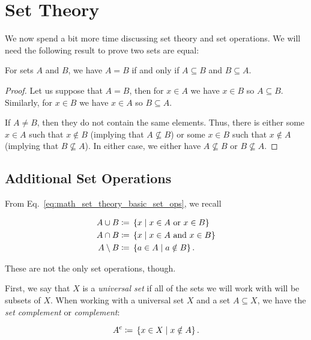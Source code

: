 \section{Set Theory}
\label{app:math_set_theory}

We now spend a bit more time discussing set theory and set operations.
We will need the following result to prove two \glspl{set} are equal:

\begin{thm}
\label{thm:set_equality}
For \glspl{set} $A$ and $B$, we have $A=B$ if and only if
$A\subseteq B$ and $B\subseteq A$.
\end{thm}

\begin{proof}
Let us suppose that $A=B$, then for $x\in A$ we have $x\in B$
so $A\subseteq B$.
Similarly, for $x\in B$ we have $x\in A$ so $B\subseteq A$.

If $A\ne B$, then they do not contain the same elements.
Thus, there is either some $x\in A$ such that $x \notin B$
(implying that $A\not\subseteq B$)
or some $x\in B$ such that $x\notin A$
(implying that $B\not\subseteq A$).
In either case, we either have $A\not\subseteq B$ or $B\not\subseteq A$.
\end{proof}

\subsection{Additional Set Operations}

From Eq.~\eqref{eq:math_set_theory_basic_set_ops}, we recall

\begin{align}
    A \cup B &\coloneqq{} \left\{ x \mid x\in A \text{ or } x\in B \right\}
        \nonumber\\
    A \cap B &\coloneqq{} \left\{ x \mid x\in A \text{ and } x\in B \right\}
        \nonumber\\
    A \setminus B &\coloneqq{} \left\{ a\in A \mid a\notin B \right\}.
\end{align}

\noindent
These are not the only set operations, though.

First, we say that $X$ is a \emph{universal set} if all of the sets
we will work with will be subsets of $X$.
When working with a universal set $X$ and a set $A\subseteq X$,
we have the \emph{set complement} or \emph{complement}:

\begin{equation}
    A^{c} \coloneqq{} \left\{ x\in X \mid x\notin A \right\}.
\end{equation}

